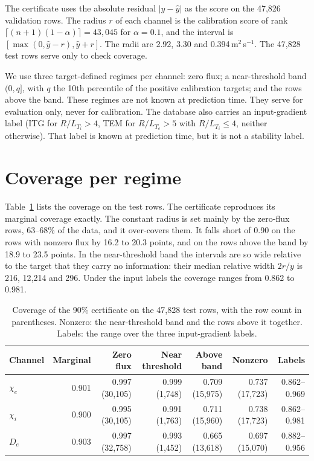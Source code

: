 \documentclass[11pt]{article}
\begin{document}
The certificate uses the absolute residual $|y - \hat{y}|$ as the score on the
47,826 validation rows.  The radius $r$ of each channel is the calibration
score of rank $\lceil (n+1)(1-\alpha) \rceil = 43{,}045$ for $\alpha = 0.1$, and
the interval is $[\max(0, \hat{y} - r), \hat{y} + r]$.  The radii are 2.92,
3.30 and 0.394\,m$^2$\,s$^{-1}$.  The 47,828 test rows serve only to check
coverage.

We use three target-defined regimes per channel: zero flux; a near-threshold
band $(0, q]$, with $q$ the 10th percentile of the positive calibration
targets; and the rows above the band.  These regimes are not known at
prediction time.  They serve for evaluation only, never for calibration.  The
database also carries an input-gradient label (ITG for $R/L_{T_i} > 4$, TEM for
$R/L_{T_e} > 5$ with $R/L_{T_i} \le 4$, neither otherwise).  That label is
known at prediction time, but it is not a stability label.

\section{Coverage per regime}

Table~\ref{tab:regimes} lists the coverage on the test rows.  The certificate
reproduces its marginal coverage exactly.  The constant radius is set mainly by
the zero-flux rows, 63--68\% of the data, and it over-covers them.  It
falls short of 0.90 on the rows with nonzero flux by 16.2 to 20.3 points, and
on the rows above the band by 18.9 to 23.5 points.  In the near-threshold band the intervals are so
wide relative to the target that they carry no information: their median
relative width $2r/y$ is 216, 12,214 and 296.  Under the input labels the
coverage ranges from 0.862 to 0.981.

\begin{table}[ht]
\centering
\caption{Coverage of the 90\% certificate on the 47,828 test rows, with the
row count in parentheses.  Nonzero: the near-threshold band and the rows
above it together.  Labels: the range over the three input-gradient labels.}
\label{tab:regimes}
\small
\begin{tabular}{lrrrrrr}
\toprule
Channel & Marginal & Zero flux & Near threshold & Above band & Nonzero & Labels \\
\midrule
$\chi_e$ & 0.901 & 0.997 (30,105) & 0.999 (1,748) & 0.709 (15,975) & 0.737 (17,723) & 0.862--0.969 \\
$\chi_i$ & 0.900 & 0.995 (30,105) & 0.991 (1,763) & 0.711 (15,960) & 0.738 (17,723) & 0.862--0.981 \\
$D_e$ & 0.903 & 0.997 (32,758) & 0.993 (1,452) & 0.665 (13,618) & 0.697 (15,070) & 0.882--0.956 \\
\bottomrule
\end{tabular}
\end{table}
\end{document}
